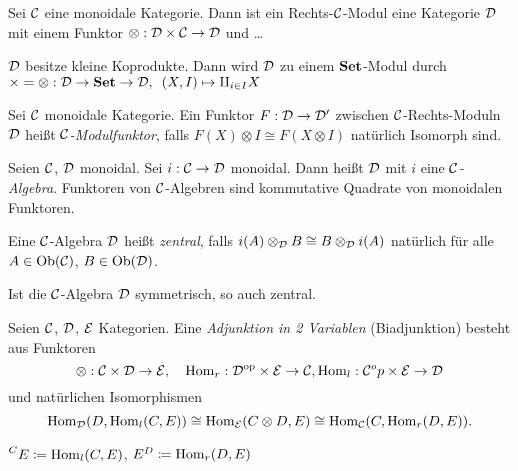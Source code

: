 \documentclass{cheat-sheet}
\begin{document}
\begin{defn}
  Sei $\mathcal{C}$ eine monoidale Kategorie. Dann ist ein Rechts-$\mathcal{C}$-Modul eine Kategorie $\mathcal{D}$ mit einem Funktor $\otimes : \mathcal{D} \times \mathcal{C} \to \mathcal{D}$ und \ldots
\end{defn}

\begin{bsp}
  $\mathcal{D}$ besitze kleine Koprodukte. Dann wird $\mathcal{D}$ zu einem $\mathbf{Set}$-Modul durch $\times = \otimes : \mathcal{D} \to \mathbf{Set} \to \mathcal{D}, \enspace (X, I) \mapsto \amalg_{i \in I} X$
\end{bsp}

\begin{defn}
  Sei $\mathcal{C}$ monoidale Kategorie. Ein Funktor $F : \mathcal{D} \to \mathcal{D}'$ zwischen $\mathcal{C}$-Rechts-Moduln $\mathcal{D}$ heißt \emph{$\mathcal{C}$-Modulfunktor}, falls $F(X) \otimes I \cong F(X \otimes I)$ natürlich Isomorph sind.
\end{defn}

\begin{defn}
  Seien $\mathcal{C}$, $\mathcal{D}$ monoidal. Sei $i : \mathcal{C} \to \mathcal{D}$ monoidal. Dann heißt $\mathcal{D}$ mit $i$ eine \emph{$\mathcal{C}$-Algebra}.
  Funktoren von $\mathcal{C}$-Algebren sind kommutative Quadrate von monoidalen Funktoren.
\end{defn}


\begin{defn}
  Eine $\mathcal{C}$-Algebra $\mathcal{D}$ heißt \emph{zentral}, falls $i(A) \otimes_{\mathcal{D}} B \cong B \otimes_{\mathcal{D}} i(A)$ natürlich für alle $A \in \operatorname{Ob}(\mathcal{C})$, $B \in \operatorname{Ob}(\mathcal{D})$.
\end{defn}

\begin{bem}
  Ist die $\mathcal{C}$-Algebra $\mathcal{D}$ symmetrisch, so auch zentral.
\end{bem}

\begin{defn}
  Seien $\mathcal{C}$, $\mathcal{D}$, $\mathcal{E}$ Kategorien. Eine \emph{Adjunktion in 2 Variablen} (Biadjunktion) besteht aus Funktoren
  \[
    \otimes : \mathcal{C} \times \mathcal{D} \to \mathcal{E}, \quad
    \operatorname{Hom}_r : \mathcal{D}^{\mathrm{op}} \times \mathcal{E} \to \mathcal{C},
    \operatorname{Hom}_l : \mathcal{C}^op \times \mathcal{E} \to \mathcal{D}
  \]
  und natürlichen Isomorphismen
  \[
    \operatorname{Hom}_{\mathcal{D}}(D, \operatorname{Hom}_l(C, E)) \cong \operatorname{Hom}_{\mathcal{E}}(C \otimes D, E) \cong \operatorname{Hom}_{\mathcal{C}}(C, \operatorname{Hom}_r(D, E)).
  \]
\end{defn}

\begin{nota}
  $\prescript{C}{} E \coloneqq \operatorname{Hom}_l(C, E)$,
  $E^D \coloneqq \operatorname{Hom}_r(D, E)$
\end{nota}
\end{document}
